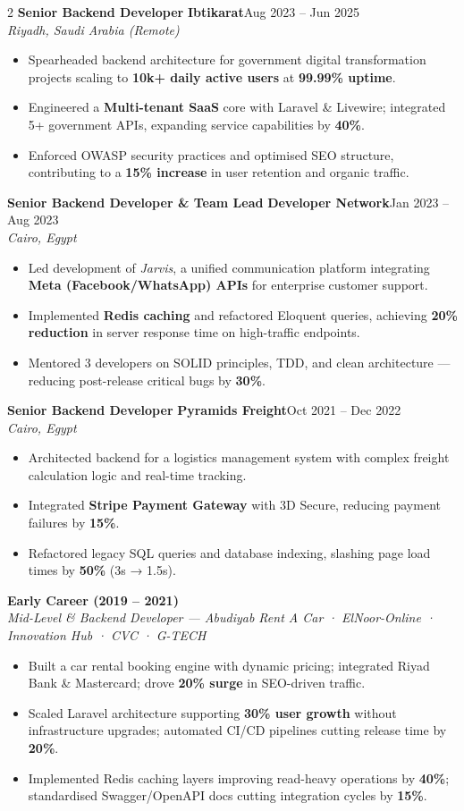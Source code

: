 \documentclass[10pt, a4paper]{article}
\newcommand{\job}[4]{%
  \vspace{5pt}%
  {\bfseries\color{Dark}#1}\enspace{\color{Light}|}\enspace%
  {\bfseries\color{Blue}#2}\hfill{\footnotesize\color{Light}#3}\\%
  {\small\itshape\color{Light}#4}\vspace{2pt}%
}
\newcommand{\bitem}[1]{%
  \item\small{\color{Mid}#1}%
}
\newenvironment{blist}{%
  \begin{itemize}[leftmargin=0.18in, itemsep=1pt, topsep=1pt, parsep=0pt]%
}{%
  \end{itemize}%
}
\begin{document}
\begin{paracol}{2}
\job{Senior Backend Developer}{Ibtikarat}{Aug 2023 – Jun 2025}{Riyadh, Saudi Arabia (Remote)}
\begin{blist}
  \bitem{Spearheaded backend architecture for government digital transformation projects scaling to \textbf{10k+ daily active users} at \textbf{99.99\% uptime}.}
  \bitem{Engineered a \textbf{Multi-tenant SaaS} core with Laravel \& Livewire; integrated 5+ government APIs, expanding service capabilities by \textbf{40\%}.}
  \bitem{Enforced OWASP security practices and optimised SEO structure, contributing to a \textbf{15\% increase} in user retention and organic traffic.}
\end{blist}

\job{Senior Backend Developer \& Team Lead}{Developer Network}{Jan 2023 – Aug 2023}{Cairo, Egypt}
\begin{blist}
  \bitem{Led development of \textit{Jarvis}, a unified communication platform integrating \textbf{Meta (Facebook/WhatsApp) APIs} for enterprise customer support.}
  \bitem{Implemented \textbf{Redis caching} and refactored Eloquent queries, achieving \textbf{20\% reduction} in server response time on high-traffic endpoints.}
  \bitem{Mentored 3 developers on SOLID principles, TDD, and clean architecture — reducing post-release critical bugs by \textbf{30\%}.}
\end{blist}

\job{Senior Backend Developer}{Pyramids Freight}{Oct 2021 – Dec 2022}{Cairo, Egypt}
\begin{blist}
  \bitem{Architected backend for a logistics management system with complex freight calculation logic and real-time tracking.}
  \bitem{Integrated \textbf{Stripe Payment Gateway} with 3D Secure, reducing payment failures by \textbf{15\%}.}
  \bitem{Refactored legacy SQL queries and database indexing, slashing page load times by \textbf{50\%} (3s → 1.5s).}
\end{blist}

\vspace{6pt}
{\small\bfseries\color{Dark}Early Career (2019 – 2021)}\\
{\small\itshape\color{Light}Mid-Level \& Backend Developer — Abudiyab Rent A Car · ElNoor-Online · Innovation Hub · CVC · G-TECH}
\vspace{3pt}
\begin{blist}
  \bitem{Built a car rental booking engine with dynamic pricing; integrated Riyad Bank \& Mastercard; drove \textbf{20\% surge} in SEO-driven traffic.}
  \bitem{Scaled Laravel architecture supporting \textbf{30\% user growth} without infrastructure upgrades; automated CI/CD pipelines cutting release time by \textbf{20\%}.}
  \bitem{Implemented Redis caching layers improving read-heavy operations by \textbf{40\%}; standardised Swagger/OpenAPI docs cutting integration cycles by \textbf{15\%}.}
\end{blist}


\end{paracol}
\end{document}
